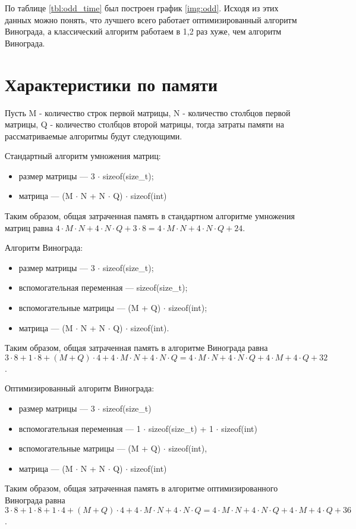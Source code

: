 По таблице \ref{tbl:odd_time} был построен график \ref{img:odd}. Исходя из этих данных можно понять, что лучшего всего работает оптимизированный алгоритм Винограда, а классический алгоритм работаем в 1,2 раз хуже, чем алгоритм Винограда.

\clearpage


\clearpage

\section {Характеристики по памяти}
Пусть M - количество строк первой матрицы, N - количество столбцов первой матрицы, Q - количество столбцов второй матрицы, тогда затраты памяти на рассматриваемые алгоритмы будут следующими.

Стандартный алгоритм умножения матриц:
\begin{itemize}[label=---]
	\item размер матрицы --- 3 $\cdot$ sizeof(size\_t);
	\item матрица --- (M $\cdot$ N + N $\cdot$ Q) $\cdot$ sizeof(int)
\end{itemize}
Таким образом, общая затраченная память в стандартном алгоритме умножения матриц равна  $4 \cdot M \cdot N + 4 \cdot N \cdot Q + 3 \cdot 8 = 4 \cdot M \cdot N + 4 \cdot N \cdot Q + 24$.

Алгоритм Винограда:
\begin{itemize}[label=---]
	\item размер матрицы --- 3 $\cdot$ sizeof(size\_t);
	\item вспомогательная переменная --- sizeof(size\_t);
	\item вспомогательные матрицы --- (M + Q) $\cdot$ sizeof(int);
	\item матрица --- (M $\cdot$ N + N $\cdot$ Q) $\cdot$ sizeof(int).
\end{itemize}
Таким образом, общая затраченная память в алгоритме Винограда равна $3 \cdot 8 + 1 \cdot 8 + (M + Q) \cdot 4 + 4 \cdot M \cdot N + 4 \cdot N \cdot Q = 4 \cdot M \cdot N + 4 \cdot N \cdot Q + 4 \cdot M + 4 \cdot Q + 32$.

Оптимизированный алгоритм Винограда:
\begin{itemize}[label=---]
	\item размер матрицы --- 3 $\cdot$ sizeof(size\_t)
	\item вспомогательная переменная --- 1 $\cdot$ sizeof(size\_t) + 1 $\cdot$ sizeof(int)
	\item вспомогательные матрицы --- (M + Q) $\cdot$ sizeof(int),
	\item матрица --- (M $\cdot$ N + N $\cdot$ Q) $\cdot$ sizeof(int)
\end{itemize}
Таким образом, общая затраченная память в алгоритме оптимизированного Винограда равна $3 \cdot 8 + 1 \cdot 8 + 1 \cdot 4 + (M + Q) \cdot 4 + 4 \cdot M \cdot N + 4 \cdot N \cdot Q = 4 \cdot M \cdot N + 4 \cdot N \cdot Q + 4 \cdot M + 4 \cdot Q + 36$.

